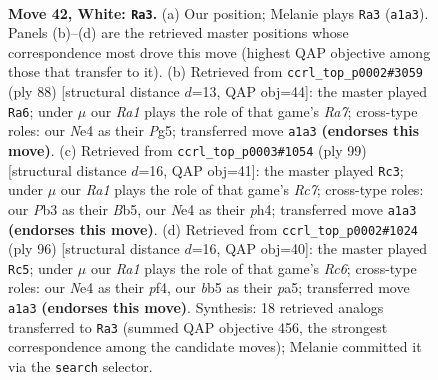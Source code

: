 \documentclass[11pt]{article}
\begin{document}
\clearpage

\begin{figure}[p]\centering
\begin{subfigure}{0.46\textwidth}\centering
\resizebox{\linewidth}{!}{%
\newchessgame
\chessboard[
  setfen={r7/4k3/8/pb2p3/4N3/1P4P1/6K1/R7 w - - 4 42},
  showmover=false,
  pgfstyle=straightmove, color=movearrow, markmove={a1-a3}
]}
\caption{}
\end{subfigure}\hfill
\begin{subfigure}{0.46\textwidth}\centering
\resizebox{\linewidth}{!}{%
\newchessgame
\chessboard[
  setfen={6k1/R7/6p1/6P1/7P/p5K1/8/r7 w - - 3 45},
  showmover=false,
  pgfstyle=straightmove, color=movearrow, markmove={a7-a6}
]}
\caption{}
\end{subfigure}
\\[4pt]
\begin{subfigure}{0.46\textwidth}\centering
\resizebox{\linewidth}{!}{%
\newchessgame
\chessboard[
  setfen={6k1/6p1/5p2/1b6/7P/4BP2/2r3PK/R7 b - - 16 50},
  showmover=false,
  pgfstyle=straightmove, color=movearrow, markmove={c2-c3}
]}
\caption{}
\end{subfigure}\hfill
\begin{subfigure}{0.46\textwidth}\centering
\resizebox{\linewidth}{!}{%
\newchessgame
\chessboard[
  setfen={8/8/2R3pk/p7/5p1P/5P2/6PK/r7 w - - 8 49},
  showmover=false,
  pgfstyle=straightmove, color=movearrow, markmove={c6-c5}
]}
\caption{}
\end{subfigure}
\caption{\textbf{Move 42, White: \texttt{Ra3}.} (a) Our position; Melanie plays \texttt{Ra3} (\texttt{a1a3}). Panels (b)--(d) are the retrieved master positions whose correspondence most drove this move (highest QAP objective among those that transfer to it). (b) Retrieved from \texttt{ccrl\_top\_p0002\#3059} (ply 88) [structural distance $d$=13, QAP obj=44]: the master played \texttt{Ra6}; under $\mu$ our \emph{Ra1} plays the role of that game's \emph{Ra7}; cross-type roles: our \emph{N}e4 as their \emph{P}g5; transferred move \texttt{a1a3} \textbf{(endorses this move)}. (c) Retrieved from \texttt{ccrl\_top\_p0003\#1054} (ply 99) [structural distance $d$=16, QAP obj=41]: the master played \texttt{Rc3}; under $\mu$ our \emph{Ra1} plays the role of that game's \emph{Rc7}; cross-type roles: our \emph{P}b3 as their \emph{B}b5, our \emph{N}e4 as their \emph{p}h4; transferred move \texttt{a1a3} \textbf{(endorses this move)}. (d) Retrieved from \texttt{ccrl\_top\_p0002\#1024} (ply 96) [structural distance $d$=16, QAP obj=40]: the master played \texttt{Rc5}; under $\mu$ our \emph{Ra1} plays the role of that game's \emph{Rc6}; cross-type roles: our \emph{N}e4 as their \emph{p}f4, our \emph{b}b5 as their \emph{p}a5; transferred move \texttt{a1a3} \textbf{(endorses this move)}. Synthesis: 18 retrieved analogs transferred to \texttt{Ra3} (summed QAP objective 456, the strongest correspondence among the candidate moves); Melanie committed it via the \texttt{search} selector.}
\label{fig:thought-m82}
\end{figure}
\end{document}

